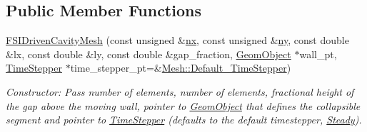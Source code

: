 \subsection*{Public Member Functions}
\begin{DoxyCompactItemize}
\item 
\hyperlink{classoomph_1_1FSIDrivenCavityMesh_af227477a1de5faf56352d21913a91feb}{F\+S\+I\+Driven\+Cavity\+Mesh} (const unsigned \&\hyperlink{classoomph_1_1SimpleRectangularQuadMesh_a4ff7678ec433180e2245ea2147f222b7}{nx}, const unsigned \&\hyperlink{classoomph_1_1SimpleRectangularQuadMesh_a45011f22dedd480392b1f376e4269921}{ny}, const double \&lx, const double \&ly, const double \&gap\+\_\+fraction, \hyperlink{classoomph_1_1GeomObject}{Geom\+Object} $\ast$wall\+\_\+pt, \hyperlink{classoomph_1_1TimeStepper}{Time\+Stepper} $\ast$time\+\_\+stepper\+\_\+pt=\&\hyperlink{classoomph_1_1Mesh_a12243d0fee2b1fcee729ee5a4777ea10}{Mesh\+::\+Default\+\_\+\+Time\+Stepper})
\begin{DoxyCompactList}\small\item\em Constructor\+: Pass number of elements, number of elements, fractional height of the gap above the moving wall, pointer to \hyperlink{classoomph_1_1GeomObject}{Geom\+Object} that defines the collapsible segment and pointer to \hyperlink{classoomph_1_1TimeStepper}{Time\+Stepper} (defaults to the default timestepper, \hyperlink{classoomph_1_1Steady}{Steady}). \end{DoxyCompactList}\end{DoxyCompactItemize}
